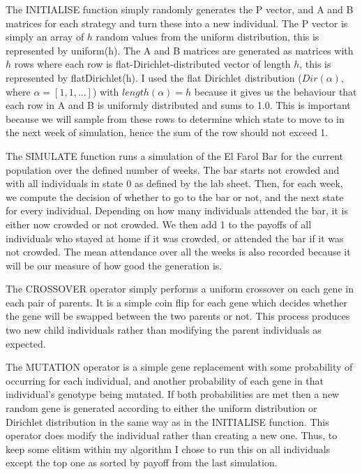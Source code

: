 \documentclass[11pt]{article}
\begin{document}
The INITIALISE function simply randomly generates the P vector, and A and B matrices for each strategy and turn these into a new individual.
The P vector is simply an array of $h$ random values from the uniform distribution, this is represented by uniform(h).
The A and B matrices are generated as matrices with $h$ rows where each row is flat-Dirichlet-distributed vector of length $h$, this is represented by flatDirichlet(h).
I used the flat Dirichlet distribution ($Dir(\alpha)$, where $\alpha = [1, 1, ...]$) with $length(\alpha) = h$ because it gives us the behaviour that each row in A and B is uniformly distributed and sums to 1.0.
This is important because we will sample from these rows to determine which state to move to in the next week of simulation, hence the sum of the row should not exceed 1.

The SIMULATE function runs a simulation of the El Farol Bar for the current population over the defined number of weeks.
The bar starts not crowded and with all individuals in state 0 as defined by the lab sheet.
Then, for each week, we compute the decision of whether to go to the bar or not, and the next state for every individual.
Depending on how many individuals attended the bar, it is either now crowded or not crowded.
We then add 1 to the payoffs of all individuals who stayed at home if it was crowded, or attended the bar if it was not crowded.
The mean attendance over all the weeks is also recorded because it will be our measure of how good the generation is.

The CROSSOVER operator simply performs a uniform crossover on each gene in each pair of parents.
It is a simple coin flip for each gene which decides whether the gene will be swapped between the two parents or not.
This process produces two new child individuals rather than modifying the parent individuals as expected.

The MUTATION operator is a simple gene replacement with some probability of occurring for each individual, and another probability of each gene in that individual's genotype being mutated.
If both probabilities are met then a new random gene is generated according to either the uniform distribution or Dirichlet distribution in the same way as in the INITIALISE function.
This operator does modify the individual rather than creating a new one.
Thus, to keep some elitism within my algorithm I chose to run this on all individuals except the top one as sorted by payoff from the last simulation.
\end{document}
